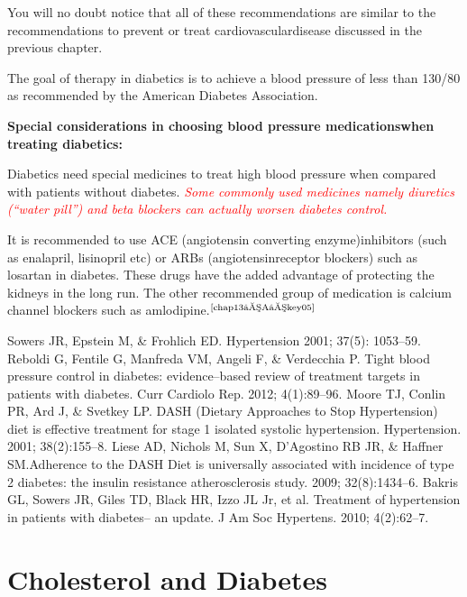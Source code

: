 You will no doubt notice that all of these recommendations are similar to the recommendations to prevent or treat cardiovascular\break disease discussed in the previous chapter.

The goal of therapy in diabetics is to achieve a blood pressure of less than 130/80 as recommended by the American Diabetes Association.

\noindent\textbf{Special considerations in choosing blood pressure medications\break when treating diabetics:}

Diabetics need special medicines to treat high blood pressure when compared with patients without diabetes. \textcolor{red}{\textit{Some commonly used medicines namely diuretics (“water pill”) and beta blockers can actually worsen diabetes control.}}

It is recommended to use ACE (angiotensin converting enzyme)\break inhibitors (such as enalapril, lisinopril etc) or ARBs (angiotensin\break receptor blockers) such as losartan in diabetes. These drugs have the added advantage of protecting the kidneys in the long run. The other recommended group of medication is calcium channel blockers such as amlodipine.$^{\text{\cite{chap13–A–key05}}}$

\begin{thebibliography}{99}
 Sowers JR, Epstein M, \& Frohlich ED. Hypertension 2001; 37(5): 1053–59.
 Reboldi G, Fentile G, Manfreda VM, Angeli F, \& Verdecchia P. Tight blood pressure control in diabetes: evidence–based review of treatment targets in patients with diabetes. Curr Cardiolo Rep. 2012; 4(1):89–96.
 Moore TJ, Conlin PR, Ard J, \& Svetkey LP. DASH (Dietary Approaches to Stop Hypertension) diet is effective treatment for stage 1 isolated systolic hypertension. Hypertension. 2001; 38(2):155–8.
 Liese AD, Nichols M, Sun X, D’Agostino RB JR, \& Haffner SM.\break Adherence to the DASH Diet is universally associated with incidence of type 2 diabetes: the insulin resistance atherosclerosis study. 2009; 32(8):1434–6.
 Bakris GL, Sowers JR, Giles TD, Black HR, Izzo JL Jr, et al. Treatment of hypertension in patients with diabetes– an update. J Am Soc Hypertens. 2010; 4(2):62–7.
\end{thebibliography}

\newpage
 
\setcounter{chapter}{12}
\renewcommand{\thechapter}{\arabic{chapter}B}
\chapter{Cholesterol and Diabetes}\label{chap13B}

